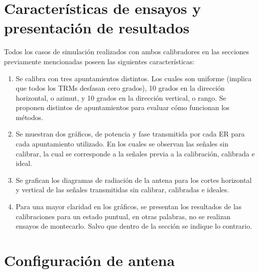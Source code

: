 \section{Características de ensayos y presentación de resultados}
\label{sc:characteristics}

Todos los casos de simulación realizados con ambos calibradores en las secciones previamente mencionadas poseen las siguientes
características:
\begin{enumerate}
	\item Se calibra con tres apuntamientos distintos. Los cuales son uniforme (implica que todos los TRMs desfasan cero grados),
		10 grados en la dirección horizontal, o azimut, y 10 grados en la dirección vertical, o rango. Se proponen distintos de
		apuntamientos para evaluar cómo funcionan los métodos. 
	\item Se muestran dos gráficos, de potencia y fase transmitida por cada ER para cada apuntamiento utilizado. En los cuales se
		observan las señales sin calibrar, la cual se corresponde a la señales previa a la calibración, calibrada e ideal. 
	\item Se grafican los diagramas de radiación de la antena para los cortes horizontal y vertical de las señales transmitidas
		sin calibrar, calibradas e ideales.
	\item Para una mayor claridad en los gráficos, se presentan los resultados de las calibraciones para un estado puntual, en
		otras palabras, no se realizan ensayos de montecarlo. Salvo que dentro de la sección se indique lo contrario.
\end{enumerate}


\section{Configuración de antena}

